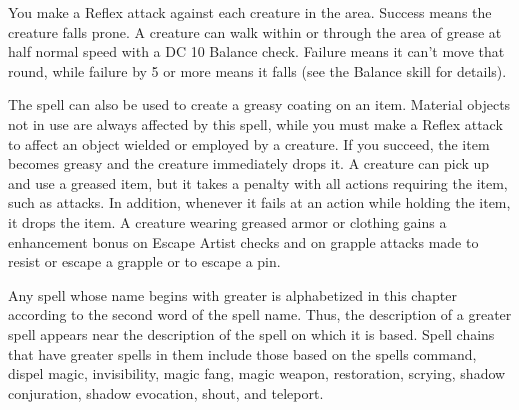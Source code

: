 \spellrng{\rngclose}
\begin{spelleffect}
    You make a Reflex attack against each creature in the area. Success means the creature falls prone. A creature can walk within or through the area of grease at half normal speed with a DC 10 Balance check. Failure means it can't move that round, while failure by 5 or more means it falls (see the Balance skill for details).
  \par The spell can also be used to create a greasy coating on an item. Material objects not in use are always affected by this spell, while you must make a Reflex attack to affect an object wielded or employed by a creature. If you succeed, the item becomes greasy and the creature immediately drops it. A creature can pick up and use a greased item, but it takes a  penalty with all actions requiring the item, such as attacks. In addition, whenever it fails at an action while holding the item, it drops the item. A creature wearing greased armor or clothing gains a  enhancement bonus on Escape Artist checks and on grapple attacks made to resist or escape a grapple or to escape a pin.
\end{spelleffect}

\par Any spell whose name begins with greater is alphabetized in this chapter according to the second word of the spell name. Thus, the description of a greater spell appears near the description of the spell on which it is based. Spell chains that have greater spells in them include those based on the spells command, dispel magic, invisibility, magic fang, magic weapon, restoration, scrying, shadow conjuration, shadow evocation, shout, and teleport.


